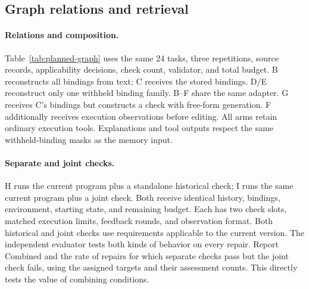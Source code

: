 \subsection{Graph relations and retrieval}
\label{sec:planned-graph}

\paragraph{Relations and composition.}
Table~\ref{tab:planned-graph} uses the same 24 tasks, three repetitions, source
records, applicability decisions, check count, validator, and total budget.
B reconstructs all bindings from text; C receives the stored bindings.
D/E reconstruct only one withheld binding family. B--F share the same adapter.
G receives C's bindings but constructs a check with free-form generation.
F additionally receives execution observations before editing. All arms
retain ordinary execution tools. Explanations and tool outputs respect the
same withheld-binding masks as the memory input.

\paragraph{Separate and joint checks.}
H runs the current program plus a standalone historical check; I runs the
same current program plus a joint check. Both receive identical history,
bindings, environment, starting state, and remaining budget. Each has two
check slots, matched execution limits, feedback rounds, and observation
format. Both historical and joint checks use requirements applicable to the
current version. The independent evaluator tests both kinds of behavior on
every repair. Report Combined and the rate of repairs for which separate
checks pass but the joint check fails, using the assigned targets and their
assessment counts. This directly tests the value of combining conditions.

